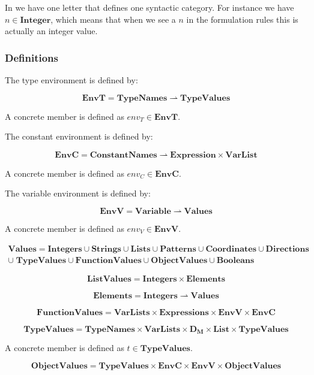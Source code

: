 In  we have one letter that defines one syntactic
category. For instance we have $n \in \mathbf{Integer}$, which means that when
we see a $n$ in the formulation rules this is actually an integer value.

\subsubsection{Definitions}

The type environment is defined by:

\[
  \mathbf{EnvT} = \mathbf{TypeNames} \rightharpoonup \mathbf{TypeValues}
\]

A concrete member is defined as $env_{T} \in \mathbf{EnvT}$.


The constant environment is defined by:

\[
  \mathbf{EnvC} = \mathbf{ConstantNames} \rightharpoonup \mathbf{Expression}
  \times \mathbf{VarList}
\]

A concrete member is defined as $env_{C} \in \mathbf{EnvC}$.

The variable environment is defined by:

\[
  \mathbf{EnvV} = \mathbf{Variable} \rightharpoonup \mathbf{Values}
\]


A concrete member is defined as $env_{V} \in \mathbf{EnvV}$.

\begin{align*}
 \mathbf{Values} = \mathbf{Integers} \cup \mathbf{Strings} \cup \mathbf{Lists}
 \cup \mathbf{Patterns} \cup \mathbf{Coordinates} \cup \mathbf{Directions}\\ 
 \cup\; \mathbf{TypeValues} \cup \mathbf{FunctionValues} \cup \mathbf{ObjectValues} 
 \cup \mathbf{Booleans}
\end{align*}

\[
  \mathbf{ListValues} = \mathbf{Integers} \times \mathbf{Elements}
\]

\[
  \mathbf{Elements} = \mathbf{Integers} \rightharpoonup \mathbf{Values}
\]
 
\[
  \mathbf{FunctionValues} = \mathbf{VarLists} \times \mathbf{Expressions} \times
  \mathbf{EnvV} \times \mathbf{EnvC}
\]

\[
  \mathbf{TypeValues} = \mathbf{TypeNames} \times \mathbf{VarLists} \times
  \mathbf{D_{M}} \times \mathbf{List} \times \mathbf{TypeValues }
\]

A concrete member is defined as $t \in \mathbf{TypeValues}$.

\[
  \mathbf{ObjectValues} = \mathbf{TypeValues} \times \mathbf{EnvC} \times
  \mathbf{EnvV} \times \mathbf{ObjectValues}
\]


